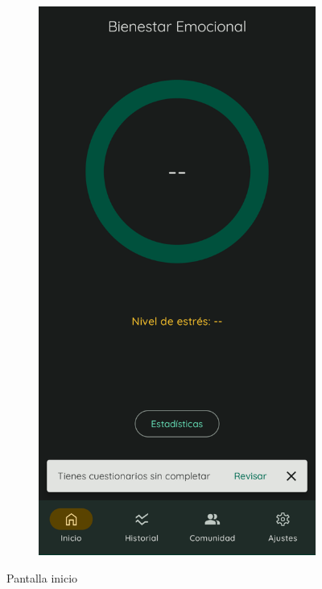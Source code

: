 \begin{figure}[htbp]
\begin{subfigure}[c]{0.4\textwidth}
                	\end{subfigure}
                	\hspace{0.1\textwidth}
                	\begin{subfigure}[c]{0.4\textwidth}
                		\centering
                		\includegraphics[width=1\linewidth]{figures/pantallas/Inicio con pendientes.png}
                	\end{subfigure}
                	\caption{Pantalla inicio}
                	\label{figure:implementacion:pantalla:inicio}
                \end{figure}
                
